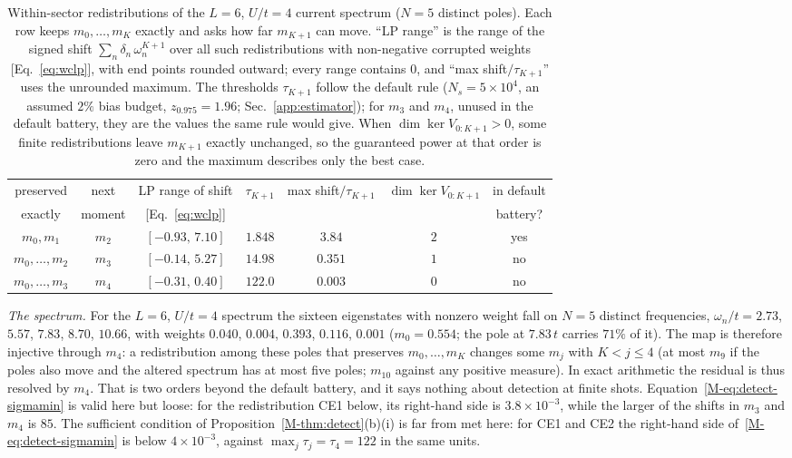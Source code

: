 \documentclass[aps,prb,onecolumn,superscriptaddress,longbibliography,floatfix]{revtex4-2}
\begin{document}
\begin{table}[tbp]
\caption{\label{tab:withinsector}Within-sector redistributions of the $L=6$, $U/t=4$ current spectrum ($N=5$ distinct poles). Each row keeps $m_0,\dots,m_K$ exactly and asks how far $m_{K+1}$ can move. ``LP range'' is the range of the signed shift $\sum_n\delta_n\,\omega_n^{K+1}$ over all such redistributions with non-negative corrupted weights [Eq.~\eqref{eq:wclp}], with end points rounded outward; every range contains $0$, and ``max shift$/\tau_{K+1}$'' uses the unrounded maximum. The thresholds $\tau_{K+1}$ follow the default rule ($N_s=5\times10^4$, an assumed $2\%$ bias budget, $z_{0.975}=1.96$; Sec.~\ref{app:estimator}); for $m_3$ and $m_4$, unused in the default battery, they are the values the same rule would give. When $\dim\ker V_{0:K+1}>0$, some finite redistributions leave $m_{K+1}$ exactly unchanged, so the guaranteed power at that order is zero and the maximum describes only the best case.}
\small
\setlength{\tabcolsep}{3pt}
\begin{tabular}{ccccccc}
\toprule
preserved & next & LP range of shift & $\tau_{K+1}$ & max shift$/\tau_{K+1}$ & $\dim\ker V_{0:K+1}$ & in default \\
exactly & moment & [Eq.~\eqref{eq:wclp}] & & & & battery? \\
\midrule
$m_0,m_1$ & $m_2$ & $[-0.93,\,7.10]$ & $1.848$ & $3.84$ & $2$ & yes \\
$m_0,\dots,m_2$ & $m_3$ & $[-0.14,\,5.27]$ & $14.98$ & $0.351$ & $1$ & no \\
$m_0,\dots,m_3$ & $m_4$ & $[-0.31,\,0.40]$ & $122.0$ & $0.003$ & $0$ & no \\
\bottomrule
\end{tabular}
\end{table}

\emph{The spectrum.} For the $L=6$, $U/t=4$ spectrum the sixteen eigenstates with nonzero weight fall on $N=5$ distinct frequencies, $\omega_n/t=2.73$, $5.57$, $7.83$, $8.70$, $10.66$, with weights $0.040$, $0.004$, $0.393$, $0.116$, $0.001$ ($m_0=0.554$; the pole at $7.83\,t$ carries $71\%$ of it). The map is therefore injective through $m_4$: a redistribution among these poles that preserves $m_0,\dots,m_K$ changes some $m_j$ with $K<j\le4$ (at most $m_9$ if the poles also move and the altered spectrum has at most five poles; $m_{10}$ against any positive measure). In exact arithmetic the residual is thus resolved by $m_4$. That is two orders beyond the default battery, and it says nothing about detection at finite shots. Equation~\eqref{M-eq:detect-sigmamin} is valid here but loose: for the redistribution CE1 below, its right-hand side is $3.8\times10^{-3}$, while the larger of the shifts in $m_3$ and $m_4$ is $85$. The sufficient condition of Proposition~\ref{M-thm:detect}(b)(i) is far from met here: for CE1 and CE2 the right-hand side of~\eqref{M-eq:detect-sigmamin} is below $4\times10^{-3}$, against $\max_j\tau_j=\tau_4=122$ in the same units.
\end{document}
